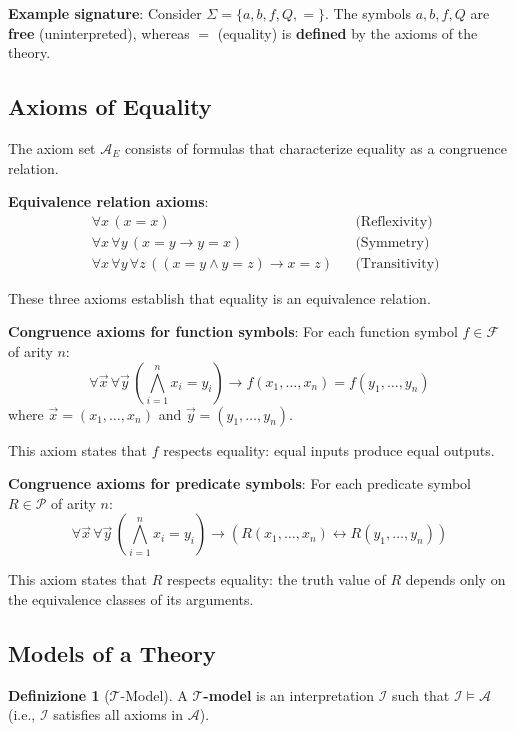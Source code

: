 \documentclass[11pt,a4paper]{article}
\theoremstyle{definition}
\newtheorem{definition}{Definizione}[section]
\theoremstyle{plain}
\theoremstyle{remark}
\begin{document}
\textbf{Example signature}: Consider $\Sigma = \{a, b, f, Q, =\}$. The symbols $a, b, f, Q$ are \textbf{free} (uninterpreted), whereas $=$ (equality) is \textbf{defined} by the axioms of the theory.

\subsection{Axioms of Equality}

The axiom set $\mathcal{A}_E$ consists of formulas that characterize equality as a congruence relation.

\textbf{Equivalence relation axioms}:
\begin{align*}
&\forall x \, (x = x) && \text{(Reflexivity)} \\
&\forall x \, \forall y \, (x = y \rightarrow y = x) && \text{(Symmetry)} \\
&\forall x \, \forall y \, \forall z \, ((x = y \wedge y = z) \rightarrow x = z) && \text{(Transitivity)}
\end{align*}

These three axioms establish that equality is an equivalence relation.

\textbf{Congruence axioms for function symbols}: For each function symbol $f \in \mathcal{F}$ of arity $n$:
\[
\forall \vec{x} \, \forall \vec{y} \, \left( \bigwedge_{i=1}^{n} x_i = y_i \right) \rightarrow f(x_1, \dots, x_n) = f(y_1, \dots, y_n)
\]
where $\vec{x} = (x_1, \dots, x_n)$ and $\vec{y} = (y_1, \dots, y_n)$.

This axiom states that $f$ respects equality: equal inputs produce equal outputs.

\textbf{Congruence axioms for predicate symbols}: For each predicate symbol $R \in \mathcal{P}$ of arity $n$:
\[
\forall \vec{x} \, \forall \vec{y} \, \left( \bigwedge_{i=1}^{n} x_i = y_i \right) \rightarrow (R(x_1, \dots, x_n) \leftrightarrow R(y_1, \dots, y_n))
\]

This axiom states that $R$ respects equality: the truth value of $R$ depends only on the equivalence classes of its arguments.

\subsection{Models of a Theory}

\begin{definition}[$\mathcal{T}$-Model]
A \textbf{$\mathcal{T}$-model} is an interpretation $\mathcal{I}$ such that $\mathcal{I} \models \mathcal{A}$ (i.e., $\mathcal{I}$ satisfies all axioms in $\mathcal{A}$).
\end{definition}
\end{document}
